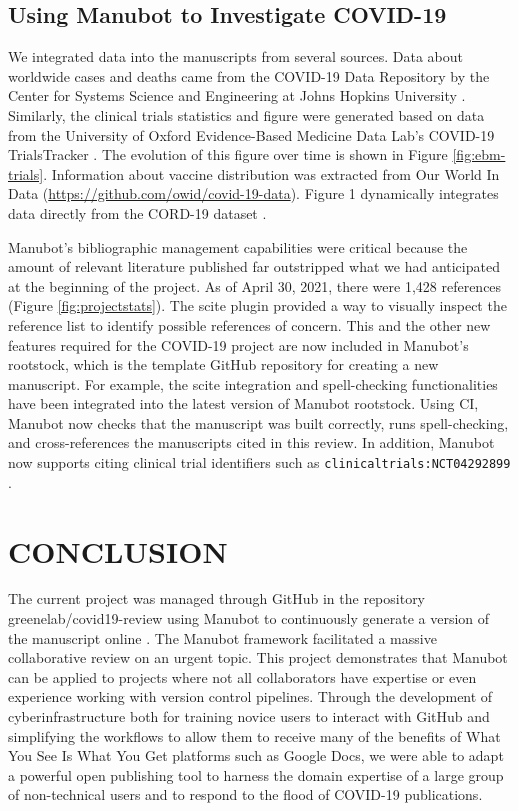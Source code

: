 \documentclass[sigconf]{acmart}
\begin{document}
\hypertarget{using-manubot-to-investigate-covid-19}{%
\subsection{Using Manubot to Investigate COVID-19}\label{using-manubot-to-investigate-covid-19}}

We integrated data into the manuscripts from several sources.
Data about worldwide cases and deaths came from the COVID-19 Data Repository by the Center for Systems Science and Engineering at Johns Hopkins University \citep{MrwDDw9R}.
Similarly, the clinical trials statistics and figure were generated based on data from the University of Oxford Evidence-Based Medicine Data Lab's COVID-19 TrialsTracker \citep{SSbnPnzT}.
The evolution of this figure over time is shown in Figure \ref{fig:ebm-trials}.
Information about vaccine distribution was extracted from Our World In Data (\url{https://github.com/owid/covid-19-data}).
Figure 1 dynamically integrates data directly from the CORD-19 dataset \citep{CiOwklc6}.

Manubot's bibliographic management capabilities were critical because the amount of relevant literature published far outstripped what we had anticipated at the beginning of the project.
As of April 30, 2021, there were 1,428 references (Figure \ref{fig:projectstats}).
The scite plugin provided a way to visually inspect the reference list to identify possible references of concern.
This and the other new features required for the COVID-19 project are now included in Manubot's rootstock, which is the template GitHub repository for creating a new manuscript.
For example, the scite integration and spell-checking functionalities have been integrated into the latest version of Manubot rootstock.
Using CI, Manubot now checks that the manuscript was built correctly, runs spell-checking, and cross-references the manuscripts cited in this review.
In addition, Manubot now supports citing clinical trial identifiers such as \texttt{clinicaltrials:NCT04292899} \citep{yTCAmOyt}.

\hypertarget{conclusion}{%
\section{CONCLUSION}\label{conclusion}}

The current project was managed through GitHub in the repository greenelab/covid19-review using Manubot \citep{YuJbg3zO} to continuously generate a version of the manuscript online \citep{yTsmmAYC}.
The Manubot framework facilitated a massive collaborative review on an urgent topic.
This project demonstrates that Manubot can be applied to projects where not all collaborators have expertise or even experience working with version control pipelines.
Through the development of cyberinfrastructure both for training novice users to interact with GitHub and simplifying the workflows to allow them to receive many of the benefits of What You See Is What You Get platforms such as Google Docs, we were able to adapt a powerful open publishing tool to harness the domain expertise of a large group of non-technical users and to respond to the flood of COVID-19 publications.
\end{document}

